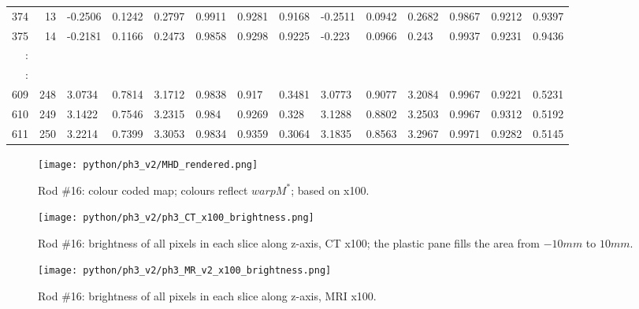\begin{table}[p]
{\begin{minipage}{\textheight}
\begin{tabular}{rr||lll|lll||lll|lll}
374    & 13   & -0.2506 & 0.1242  & 0.2797 & 0.9911 & 0.9281 & 0.9168 & -0.2511 & 0.0942  & 0.2682 & 0.9867 & 0.9212 & 0.9397 \\
375    & 14   & -0.2181 & 0.1166  & 0.2473 & 0.9858 & 0.9298 & 0.9225 & -0.223  & 0.0966  & 0.243  & 0.9937 & 0.9231 & 0.9436 \\
:      &      &         &         &        &        &        &        &         &         &        &        &        &        \\
\hline
:      &      &         &         &        &        &        &        &         &         &        &        &        &        \\
609    & 248  & 3.0734  & 0.7814  & 3.1712 & 0.9838 & 0.917  & 0.3481 & 3.0773  & 0.9077  & 3.2084 & 0.9967 & 0.9221 & 0.5231 \\
610    & 249  & 3.1422  & 0.7546  & 3.2315 & 0.984  & 0.9269 & 0.328  & 3.1288  & 0.8802  & 3.2503 & 0.9967 & 0.9312 & 0.5192 \\
611    & 250  & 3.2214  & 0.7399  & 3.3053 & 0.9834 & 0.9359 & 0.3064 & 3.1835  & 0.8563  & 3.2967 & 0.9971 & 0.9282 & 0.5145
\end{tabular}
       \label{tab:spit-out-16}
     \end{minipage}
   }
 \end{table}

\begin{figure}[!htb]
     \centering
     \texttt{[image: python/ph3\_v2/MHD\_rendered.png]}
     \caption{Rod \#16: colour coded map; colours reflect $warpM^*$; based on x100.}
     \label{fig:colour-map}
\end{figure}

\begin{figure}[!thb]
    \centering
    \texttt{[image: python/ph3\_v2/ph3\_CT\_x100\_brightness.png]}
    \caption[Rod \#16: brightness along z-axis, CT x100.]{Rod \#16: brightness of all pixels in each slice along z-axis, CT x100; the plastic pane fills the area from $-10mm$ to $10mm$.}
    \label{fig:ph3_CT_x100_brightness}
\end{figure}

\begin{figure}[!tbh]
    \centering
    \texttt{[image: python/ph3\_v2/ph3\_MR\_v2\_x100\_brightness.png]}
    \caption[Rod \#16: brightness along z-axis, MRI x100.]{Rod \#16: brightness of all pixels in each slice along z-axis, MRI x100.}
    \label{fig:ph3_MR_x100_brightness}
\end{figure}


